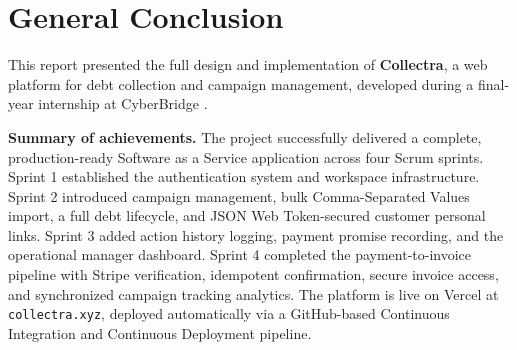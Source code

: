 \documentclass[12pt,a4paper]{report}
\begin{document}
\chapter*{General Conclusion}
{}

This report presented the full design and implementation of \textbf{Collectra}, a
web platform for debt collection and campaign management, developed during a
final-year internship at CyberBridge .

\textbf{Summary of achievements.}
The project successfully delivered a complete, production-ready Software as a Service application
across four Scrum sprints.
Sprint 1 established the authentication system and workspace infrastructure.
Sprint 2 introduced campaign management, bulk Comma-Separated Values import, a full debt lifecycle,
and JSON Web Token-secured customer personal links.
Sprint 3 added action history logging, payment promise recording, and the operational
manager dashboard.
Sprint 4 completed the payment-to-invoice pipeline with Stripe verification,
idempotent confirmation, secure invoice access, and synchronized campaign
tracking analytics.
The platform is live on Vercel at \texttt{collectra.xyz}, deployed automatically
via a GitHub-based Continuous Integration and Continuous Deployment pipeline.
\end{document}
